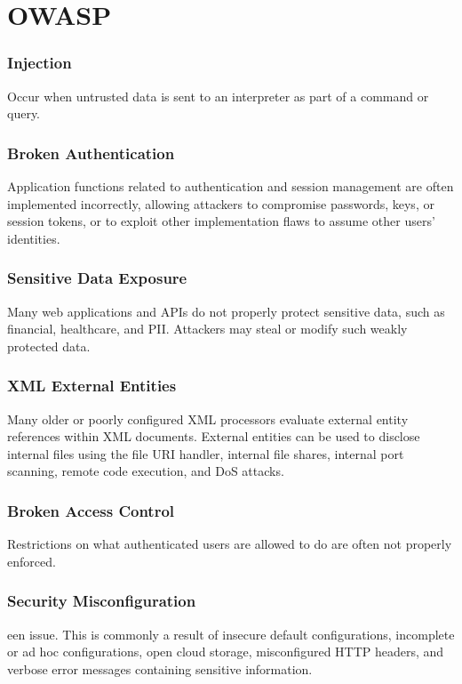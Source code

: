 \section{OWASP}
\subsubsection{Injection}
Occur when untrusted data is sent to an interpreter as part of a command or query.

\subsubsection{Broken Authentication}
Application functions related to authentication and session management are often implemented incorrectly, allowing attackers to compromise passwords, keys, or session tokens, or to exploit other implementation flaws to assume other users’ identities.

\subsubsection{Sensitive Data Exposure}
Many web applications and APIs do not properly protect sensitive data, such as financial, healthcare, and PII. Attackers may steal or modify such weakly protected data.

\subsubsection{XML External Entities}
Many older or poorly configured XML processors evaluate external entity references within XML documents. External entities can be used to disclose internal files using the file URI handler, internal file shares, internal port scanning, remote code execution, and DoS attacks.

\subsubsection{Broken Access Control}
Restrictions on what authenticated users are allowed to do are often not properly enforced.

\subsubsection{Security Misconfiguration}
een issue. This is commonly a result of insecure default configurations, incomplete or ad hoc configurations, open cloud storage, misconfigured HTTP headers, and verbose error messages containing sensitive information.

